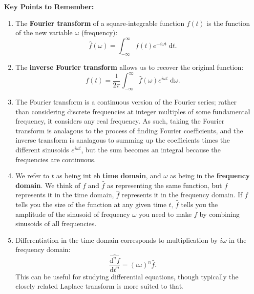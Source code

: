 \documentclass{article}
\newcommand{\deriv}[3][]{\frac{\mathrm{d}^{#1}#2}{\mathrm{d}#3^{#1}}}
\newcommand{\diff}{\;\mathrm{d}}
\begin{document}
\clearpage




{\bf Key Points to Remember:}

\vspace{5mm}

\begin{enumerate}
	\item The \textbf{Fourier transform} of a square-integrable function $f(t)$ is the function of the new variable $\omega$ (frequency):
		\[\hat{f}(\omega)=\int_{-\infty}^\infty f(t)e^{-i\omega t}\diff t.\]
	\item The \textbf{inverse Fourier transform} allows us to recover the original function:
		\[f(t)=\frac{1}{2\pi}\int_{-\infty}^\infty\hat{f}(\omega) e^{i\omega t}\diff \omega.\]
	\item The Fourier transform is a continuous version of the Fourier series; rather than considering discrete frequencies at integer multiples of some fundamental frequency, it considers any real frequency. As such, taking the Fourier transform is analagous to the process of finding Fourier coefficients, and the inverse transform is analagous to summing up the coefficients times the different sinusoids $e^{i\omega t}$, but the sum becomes an integral because the frequencies are continuous.
	\item We refer to $t$ as being int eh \textbf{time domain}, and $\omega$ as being in the \textbf{frequency domain}. We think of $f$ and $\hat{f}$ as representing the same function, but $f$ represents it in the time domain, $\hat{f}$ represents it in the frequency domain. If $f$ tells you the size of the function at any given time $t$, $\hat{f}$ tells you the amplitude of the sinusoid of frequency $\omega$ you need to make $f$ by combining sinusoids of all frequencies.
	\item Differentiation in the time domain corresponds to multiplication by $i\omega$ in the frequency domain:
		\[\widehat{\deriv[n]{f}{t}}=(i\omega)^n\hat{f}.\]
		This can be useful for studying differential equations, though typically the closely related Laplace transform is more suited to that.
\end{enumerate}
\end{document}
